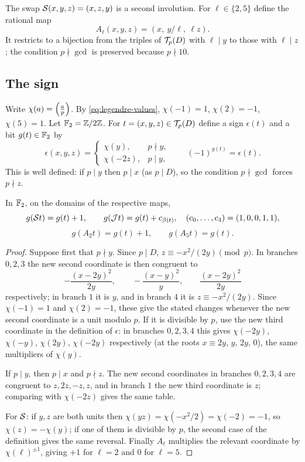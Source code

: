 The swap $\mathcal S(x,y,z)=(x,z,y)$ is a second involution. For $\ell\in\{2,5\}$
define the rational map
\[
  A_\ell(x,y,z)=(x,\ y/\ell,\ \ell z).
\]
It restricts to a bijection from the triples of $\mathcal T_p(D)$ with $\ell\mid y$ to
those with $\ell\mid z$; the condition $p\nmid\gcd$ is preserved because
$p\nmid10$.

\subsection{The sign}
Write $\chi(a)=\Bigl(\frac{a}{p}\Bigr)$. By \eqref{eq:legendre-values},
$\chi(-1)=1$, $\chi(2)=-1$, $\chi(5)=1$. Let $\mathbb{F}_2=\mathbb{Z}/2\mathbb{Z}$. For
$t=(x,y,z)\in\mathcal T_p(D)$ define a sign $\epsilon(t)$ and a bit $g(t)\in\mathbb{F}_2$ by
\[
  \epsilon(x,y,z)=\begin{cases}\chi(y),&p\nmid y,\\ \chi(-2z),&p\mid y,\end{cases}
  \qquad (-1)^{g(t)}=\epsilon(t).
\]
This is well defined: if $p\mid y$ then $p\mid x$ (as $p\mid D$), so the
condition $p\nmid\gcd$ forces $p\nmid z$.

\begin{lemma}\label{lem:sign}
In $\mathbb{F}_2$, on the domains of the respective maps,
\[
  g(\mathcal S t)=g(t)+1,\qquad g(\mathcal J t)=g(t)+c_{\beta(t)},\quad (c_0,\dots,c_4)=(1,0,0,1,1),
\]
\[
  g(A_2t)=g(t)+1,\qquad g(A_5t)=g(t).
\]
\end{lemma}

\begin{proof}
Suppose first that $p\nmid y$. Since $p\mid D$, $z\equiv-x^2/(2y)\pmod p$. In
branches $0,2,3$ the new second coordinate is then congruent to
\[
  -\frac{(x-2y)^2}{2y},\qquad -\frac{(x-y)^2}{y},\qquad \frac{(x-2y)^2}{2y}
\]
respectively; in branch $1$ it is $y$, and in branch $4$ it is $z\equiv-x^2/(2y)$.
Since $\chi(-1)=1$ and $\chi(2)=-1$, these give the stated changes whenever the new
second coordinate is a unit modulo $p$. If it is divisible by $p$, use the new third
coordinate in the definition of $\epsilon$: in branches $0,2,3,4$ this gives
$\chi(-2y)$, $\chi(-y)$, $\chi(2y)$, $\chi(-2y)$ respectively (at the roots
$x\equiv2y$, $y$, $2y$, $0$), the same multipliers of $\chi(y)$.

If $p\mid y$, then $p\mid x$ and $p\nmid z$. The new second coordinates in
branches $0,2,3,4$ are congruent to $z,2z,-z,z$, and in branch $1$ the new third
coordinate is $z$; comparing with $\chi(-2z)$ gives the same table.

For $\mathcal S$: if $y,z$ are both units then $\chi(yz)=\chi(-x^2/2)=\chi(-2)=-1$, so
$\chi(z)=-\chi(y)$; if one of them is divisible by $p$, the second case of the
definition gives the same reversal. Finally $A_\ell$ multiplies the relevant
coordinate by $\chi(\ell)^{\pm1}$, giving $+1$ for $\ell=2$ and $0$ for $\ell=5$.
\end{proof}
